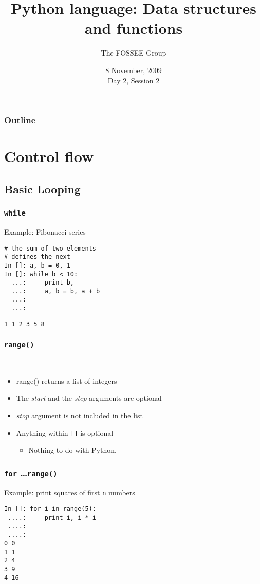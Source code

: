 \documentclass[14pt,compress]{beamer}
\title[Basic Python]{Python language: Data structures and functions}
\author[FOSSEE Team] {The FOSSEE Group}
\institute[IIT Bombay] {Department of Aerospace Engineering\\IIT Bombay}
\date[] {8 November, 2009\\Day 2, Session 2}
\newcommand{\typ}[1]{\texttt{#1}}
\newcommand{\kwrd}[1]{ \texttt{\textbf{\color{blue}{#1}}}  }
\begin{document}
\begin{frame}
  \titlepage
\end{frame}

\begin{frame}
  \frametitle{Outline}
  \tableofcontents
\end{frame}

\section{Control flow}
\subsection{Basic Looping}
\begin{frame}[fragile]
  \frametitle{\typ{while}}
Example: Fibonacci series
  \begin{lstlisting}
# the sum of two elements
# defines the next
In []: a, b = 0, 1
In []: while b < 10:
  ...:     print b,
  ...:     a, b = b, a + b
  ...:
  ...:
\end{lstlisting}
\typ{1 1 2 3 5 8}\\
\end{frame}

\begin{frame}[fragile]
\frametitle{\typ{range()}}
\kwrd{range([start,] stop[, step])}\\
\begin{itemize}
  \item range() returns a list of integers
  \item The \emph{start} and the \emph{step} arguments are optional
  \item \emph{stop} argument is not included in the list
\end{itemize}
\vspace*{.5in}
\begin{itemize}
  \item \alert{Anything within \typ{[]} is optional}
  \begin{itemize}
    \item Nothing to do with Python.
  \end{itemize}
\end{itemize}

\end{frame}

\begin{frame}[fragile]
  \frametitle{\typ{for} \ldots \typ{range()}}
Example: print squares of first \typ{n} numbers
  \begin{lstlisting}
In []: for i in range(5):
 ....:     print i, i * i
 ....:
 ....:
0 0
1 1
2 4
3 9
4 16
\end{lstlisting}
\end{frame}
\end{document}
